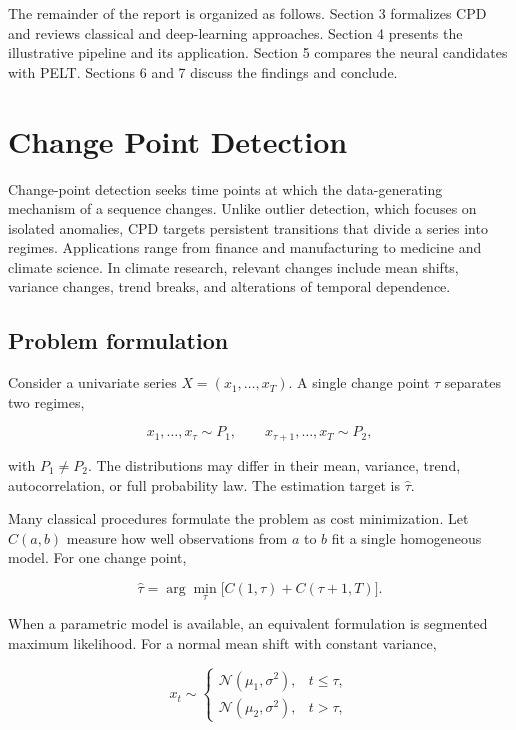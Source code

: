 \documentclass[
]{krantz}
\begin{document}
The remainder of the report is organized as follows. Section 3 formalizes CPD and reviews classical and deep-learning approaches. Section 4 presents the illustrative pipeline and its application. Section 5 compares the neural candidates with PELT. Sections 6 and 7 discuss the findings and conclude.

\section{Change Point Detection}\label{change-point-detection}

Change-point detection seeks time points at which the data-generating mechanism of a sequence changes. Unlike outlier detection, which focuses on isolated anomalies, CPD targets persistent transitions that divide a series into regimes. Applications range from finance and manufacturing to medicine and climate science. In climate research, relevant changes include mean shifts, variance changes, trend breaks, and alterations of temporal dependence.

\subsection{Problem formulation}\label{problem-formulation}

Consider a univariate series \(X=(x_1,\ldots,x_T)\). A single change point \(\tau\) separates two regimes,

\[
x_1,\ldots,x_\tau \sim P_1,
\qquad
x_{\tau+1},\ldots,x_T \sim P_2,
\]

with \(P_1\neq P_2\). The distributions may differ in their mean, variance, trend, autocorrelation, or full probability law. The estimation target is \(\hat\tau\).

Many classical procedures formulate the problem as cost minimization. Let \(C(a,b)\) measure how well observations from \(a\) to \(b\) fit a single homogeneous model. For one change point,

\[
\hat\tau
=
\arg\min_{\tau}
\bigl[
C(1,\tau)+C(\tau+1,T)
\bigr].
\]

When a parametric model is available, an equivalent formulation is segmented maximum likelihood. For a normal mean shift with constant variance,

\[
x_t\sim
\begin{cases}
\mathcal{N}(\mu_1,\sigma^2), & t\le\tau,\\
\mathcal{N}(\mu_2,\sigma^2), & t>\tau,
\end{cases}
\]
\end{document}
